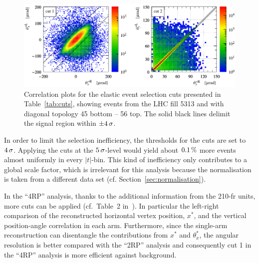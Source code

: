 \begin{figure}
\begin{center}
\includegraphics{fig/cut_example.pdf}
\caption{%
Correlation plots for the elastic event selection cuts presented in Table~\ref{tab:cuts}, showing events from the LHC fill 5313 and with diagonal topology 45 bottom -- 56 top. The solid black lines delimit the signal region within $\pm 4\,{\rm \sigma}$.
}
\label{fig:cuts}
\end{center}
\end{figure}

In order to limit the selection inefficiency, the thresholds for the cuts are set to $4\,{\rm \sigma}$. Applying the cuts at the $5\,{\rm \sigma}$-level would yield about $0.1\,{\rm \%}$ more events almost uniformly in every $|t|$-bin. This kind of inefficiency only contributes to a global scale factor, which is irrelevant for this analysis because the normalisation is taken from a different data set (cf. Section~\ref{sec:normalisation}).

In the ``4RP'' analysis, thanks to the additional information from the 210-fr units, more cuts can be applied (cf.~Table~2 in~\cite{totem-7tev-el}). In particular the left-right comparison of the reconstructed horizontal vertex position, $x^*$, and the vertical position-angle correlation in each arm. Furthermore, since the single-arm reconstruction can disentangle the contributions from $x^*$ and $\theta^*_x$, the angular resolution is better compared with the ``2RP'' analysis and consequently cut 1 in the ``4RP'' analysis is more efficient against background.





